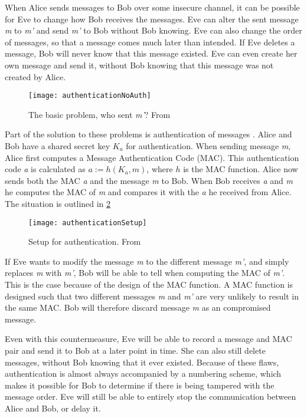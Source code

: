 When Alice sends messages to Bob over some insecure channel, it can be possible for Eve to change how Bob receives the messages.
Eve can alter the sent message \emph{m} to \emph{m'} and send \emph{m'} to Bob without Bob knowing.
Eve can also change the order of messages, so that a message comes much later than intended.
If Eve deletes a message, Bob will never know that this message existed.
Eve can even create her own message and send it, without Bob knowing that this message was not created by Alice.

\begin{figure}[H]
	\centering
	\texttt{[image: authenticationNoAuth]}
	\caption{The basic problem, who sent \emph{m'}? From \citet[p.~52]{cryptoenginering}}
	\label{crypto:noauth}
\end{figure}

Part of the solution to these problems is authentication of messages \cite[p.~52]{cryptoenginering}.
Alice and Bob have a shared secret key $K_a$ for authentication.
When sending message \emph{m}, Alice first computes a Message Authentication Code (MAC).
This authentication code \emph{a} is calculated as $a := h(K_a,m)$, where $h$ is the MAC function.
Alice now sends both the MAC \emph{a} and the message \emph{m} to Bob.
When Bob receives \emph{a} and \emph{m} he computes the MAC of \emph{m} and compares it with the \emph{a} he received from Alice.
The situation is outlined in \cref{crypto:authsetup}

\begin{figure}[H]
	\centering
	\texttt{[image: authenticationSetup]}
	\caption{Setup for authentication. From \citet[p.~53]{cryptoenginering}}
	\label{crypto:authsetup}
\end{figure}

If Eve wants to modify the message \emph{m} to the different message \emph{m'}, and simply replaces \emph{m} with \emph{m'}, Bob will be able to tell when computing the MAC of \emph{m'}.
This is the case because of the design of the MAC function.
A MAC function is designed such that two different messages \emph{m} and \emph{m'} are very unlikely to result in the same MAC.
Bob will therefore discard message \emph{m} as an compromised message.

Even with this countermeasure, Eve will be able to record a message and MAC pair and send it to Bob at a later point in time.
She can also still delete messages, without Bob knowing that it ever existed.
Because of these flaws, authentication is almost always accompanied by a numbering scheme, which makes it possible for Bob to determine if there is being tampered with the message order.
Eve will still be able to entirely stop the communication between Alice and Bob, or delay it.
